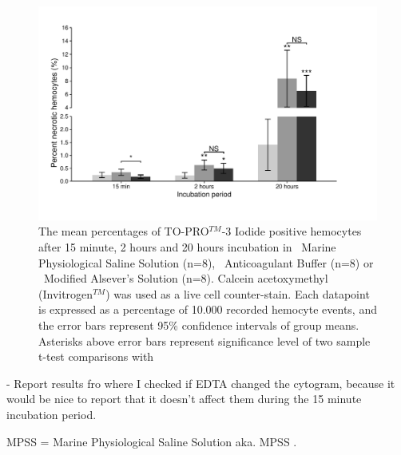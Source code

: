 \begin{figure}[!ht]
    \centering
    \includegraphics[width=1.13\textwidth]{figures/Method development/grouped bargraph scaled.pdf}
    \caption{The mean percentages of TO-PRO$^{TM}$-3 Iodide positive hemocytes after 15 minute, 2 hours and 20 hours incubation in \protect\lysegraabox \ Marine Physiological Saline Solution (n=8), \protect\customgraybox \ Anticoagulant Buffer (n=8) or \protect\darkgraybox \ Modified Alsever's Solution (n=8). Calcein acetoxymethyl (Invitrogen$^{TM}$) was used as a live cell counter-stain. Each datapoint is expressed as a percentage of 10.000 recorded hemocyte events, and the error bars represent 95\% confidence intervals of group means. Asterisks above error bars represent significance level of two sample t-test comparisons with }
    \label{fig:BufferViability}
\end{figure}

- Report results fro where I checked if EDTA changed the cytogram, because it would be nice to report that it doesn't affect them during the 15 minute incubation period.

MPSS = Marine Physiological Saline Solution aka. MPSS \cite{Hernroth2003}.
